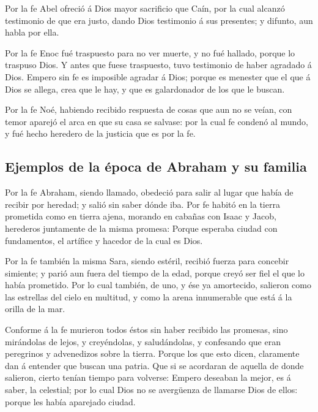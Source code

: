  Por la fe Abel ofreció á Dios mayor sacrificio que Caín,
por la cual alcanzó testimonio de que era justo, dando Dios testimonio á
sus presentes; y difunto, aun habla por ella.

 Por la fe Enoc fué traspuesto para no ver muerte, y no
fué hallado, porque lo traspuso Dios. Y antes que fuese traspuesto, tuvo
testimonio de haber agradado á Dios.  Empero sin fe es
imposible agradar á Dios; porque es menester que el que á Dios se
allega, crea que le hay, y que es galardonador de los que le buscan.

 Por la fe Noé, habiendo recibido respuesta de cosas que
aun no se veían, con temor aparejó el arca en que su casa se salvase:
por la cual fe condenó al mundo, y fué hecho heredero de la justicia que
es por la fe.

\hypertarget{ejemplos-de-la-uxe9poca-de-abraham-y-su-familia}{%
\subsection{Ejemplos de la época de Abraham y su
familia}\label{ejemplos-de-la-uxe9poca-de-abraham-y-su-familia}}

 Por la fe Abraham, siendo llamado, obedeció para salir al
lugar que había de recibir por heredad; y salió sin saber dónde iba.
 Por fe habitó en la tierra prometida como en tierra
ajena, morando en cabañas con Isaac y Jacob, herederos juntamente de la
misma promesa:  Porque esperaba ciudad con fundamentos,
el artífice y hacedor de la cual es Dios.

 Por la fe también la misma Sara, siendo estéril, recibió
fuerza para concebir simiente; y parió aun fuera del tiempo de la edad,
porque creyó ser fiel el que lo había prometido.  Por lo
cual también, de uno, y ése ya amortecido, salieron como las estrellas
del cielo en multitud, y como la arena innumerable que está á la orilla
de la mar.

 Conforme á la fe murieron todos éstos sin haber recibido
las promesas, sino mirándolas de lejos, y creyéndolas, y saludándolas, y
confesando que eran peregrinos y advenedizos sobre la tierra.
 Porque los que esto dicen, claramente dan á entender que
buscan una patria.  Que si se acordaran de aquella de
donde salieron, cierto tenían tiempo para volverse: 
Empero deseaban la mejor, es á saber, la celestial; por lo cual Dios no
se avergüenza de llamarse Dios de ellos: porque les había aparejado
ciudad.

